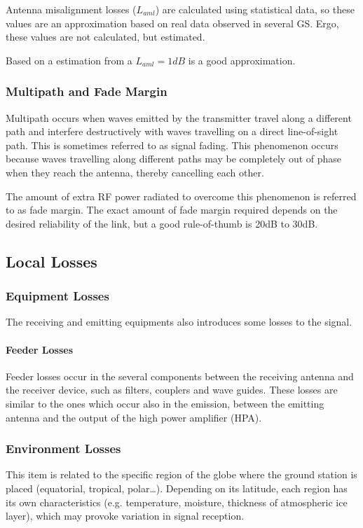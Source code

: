 Antenna misalignment losses ($L_{aml}$) are calculated using statistical data, so these values are an approximation based on real data observed in several GS. Ergo, these values are not calculated, but estimated.\cite{Jorge2012}

Based on a estimation from \cite{Macdonald2014} a $L_{aml}=1dB$ is a good approximation.

\subsubsection{Multipath and Fade Margin}
Multipath occurs when waves emitted by the transmitter travel along a different path and interfere destructively with waves travelling on a direct line-of-sight path. This is sometimes referred to as signal fading. This phenomenon occurs because waves travelling along different paths may be completely out of phase when they reach the antenna, thereby cancelling each other.

The amount of extra RF power radiated to overcome this phenomenon is referred to as fade margin. The exact
amount of fade margin required depends on the desired reliability of the link, but a good rule-of-thumb is 20dB to 30dB.

\subsection{Local Losses}
\subsubsection{Equipment Losses}
The receiving and emitting equipments also introduces some losses to the signal.

\paragraph{Feeder Losses} Feeder losses occur in the several components between the receiving antenna and the receiver device, such as filters, couplers and wave guides. These losses are similar to the ones which occur also in the emission, between the emitting antenna and the output of the high power amplifier (HPA).\cite{Jorge2012}

\subsubsection{Environment Losses}
This item is related to the specific region of the globe where the ground station is placed (equatorial, tropical, polar…). Depending on its latitude, each region has its own characteristics (e.g. temperature, moisture, thickness of atmospheric ice layer), which may provoke variation in signal reception. \cite{Jorge2012}

